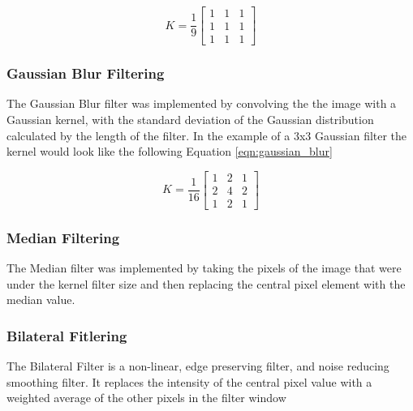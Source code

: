 \documentclass{article}\raggedbottom
\begin{document}
\begin{equation}\label{eqn:blur}
	K = \frac{1}{9}
	\begin{bmatrix}
	1 & 1 & 1\\
	1 & 1 & 1\\
	1 & 1 & 1
	\end{bmatrix}
\end{equation} 

\subsubsection{Gaussian Blur Filtering}
The Gaussian Blur filter was implemented by convolving the the image with a Gaussian kernel, with the standard deviation of the Gaussian distribution calculated by the length of the filter. In the example of a $3$x$3$ Gaussian  filter the kernel would look like the following Equation \eqref{eqn:gaussian_blur}

\begin{equation}\label{eqn:gaussian_blur}
	K = \frac{1}{16}
	\begin{bmatrix}
	1 & 2 & 1\\
	2 & 4 & 2\\
	1 & 2 & 1
	\end{bmatrix}
\end{equation}

\subsubsection{Median Filtering}
The Median filter was implemented by taking the pixels of the image that were under the kernel filter size and then replacing the central pixel element with the median value.

\subsubsection{Bilateral Fitlering}
The Bilateral Filter is a non-linear, edge preserving filter, and noise reducing smoothing filter. It replaces the intensity of the central pixel value with a weighted average of the other pixels in the filter window


 
\end{document}
